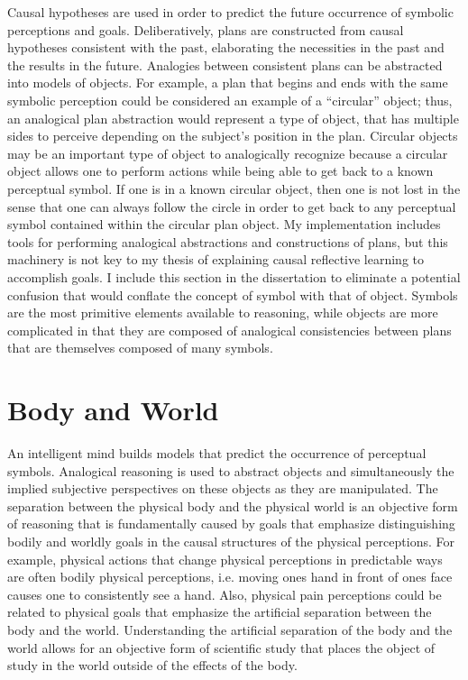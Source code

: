 Causal hypotheses are used in order to predict the future occurrence
of symbolic perceptions and goals.  Deliberatively, plans are
constructed from causal hypotheses consistent with the past,
elaborating the necessities in the past and the results in the future.
Analogies between consistent plans can be abstracted into models of
objects.  For example, a plan that begins and ends with the same
symbolic perception could be considered an example of a ``circular''
object; thus, an analogical plan abstraction would represent a type of
object, that has multiple sides to perceive depending on the subject's
position in the plan.  Circular objects may be an important type of
object to analogically recognize because a circular object allows one
to perform actions while being able to get back to a known perceptual
symbol.  If one is in a known circular object, then one is not lost in
the sense that one can always follow the circle in order to get back
to any perceptual symbol contained within the circular plan object.
My implementation includes tools for performing analogical
abstractions and constructions of plans, but this machinery is not key
to my thesis of explaining causal reflective learning to accomplish
goals.  I include this section in the dissertation to eliminate a
potential confusion that would conflate the concept of symbol with
that of object.  Symbols are the most primitive elements available to
reasoning, while objects are more complicated in that they are
composed of analogical consistencies between plans that are themselves
composed of many symbols.

\section{Body and World}

An intelligent mind builds models that predict the occurrence of
perceptual symbols.  Analogical reasoning is used to abstract objects
and simultaneously the implied subjective perspectives on these
objects as they are manipulated.  The separation between the physical
body and the physical world is an objective form of reasoning that is
fundamentally caused by goals that emphasize distinguishing bodily and
worldly goals in the causal structures of the physical perceptions.
For example, physical actions that change physical perceptions in
predictable ways are often bodily physical perceptions, i.e. moving
ones hand in front of ones face causes one to consistently see a hand.
Also, physical pain perceptions could be related to physical goals
that emphasize the artificial separation between the body and the
world.  Understanding the artificial separation of the body and the
world allows for an objective form of scientific study that places the
object of study in the world outside of the effects of the body.

